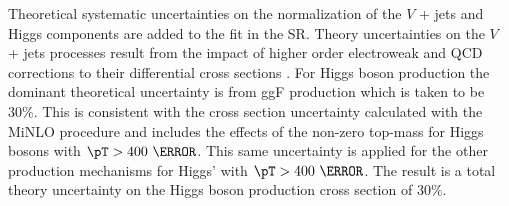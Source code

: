 Theoretical systematic uncertainties on the normalization of the $V$ + jets and
Higgs components are added to the fit in the SR.  Theory uncertainties on the
$V$ + jets processes result from the impact of higher order electroweak and QCD
corrections to their differential cross sections \cite{Lindert:2017olm}. For
Higgs boson production the dominant theoretical uncertainty is from ggF
production which is taken to be $30\%$.  This is consistent with the cross
section uncertainty calculated with the MiNLO procedure and includes the
effects of the non-zero top-mass for Higgs bosons with $\pT > 400~\GeV$.  This
same uncertainty is applied for the other production mechanisms for Higgs' with
$\pT > 400~\GeV$.  The result is a total theory uncertainty on the Higgs boson
production cross section of $30\%$.
